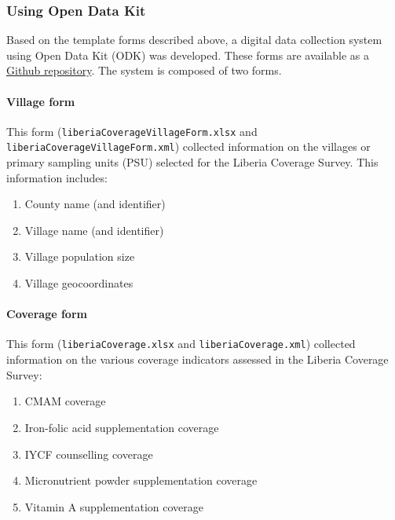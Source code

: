 \documentclass[12pt,a4paper]{article}
\let\oldparagraph\paragraph
\renewcommand{\paragraph}[1]{\oldparagraph{#1}\mbox{}}
\begin{document}
\hypertarget{using-open-data-kit}{%
\subsubsection{Using Open Data Kit}\label{using-open-data-kit}}

Based on the template forms described above, a digital data collection system using Open Data Kit (ODK) was developed. These forms are available as a \href{https://github.com/validmeasures/liberiaS3Mforms}{Github repository}. The system is composed of two forms.

\hypertarget{village-form}{%
\paragraph{Village form}\label{village-form}}

This form (\texttt{liberiaCoverageVillageForm.xlsx} and \texttt{liberiaCoverageVillageForm.xml}) collected information on the villages or primary sampling units (PSU) selected for the Liberia Coverage Survey. This information includes:

\begin{enumerate}
\def\labelenumi{\arabic{enumi}.}
\item
  County name (and identifier)
\item
  Village name (and identifier)
\item
  Village population size
\item
  Village geocoordinates
\end{enumerate}

\hypertarget{coverage-form}{%
\paragraph{Coverage form}\label{coverage-form}}

This form (\texttt{liberiaCoverage.xlsx} and \texttt{liberiaCoverage.xml}) collected information on the various coverage indicators assessed in the Liberia Coverage Survey:

\begin{enumerate}
\def\labelenumi{\arabic{enumi}.}
\item
  CMAM coverage
\item
  Iron-folic acid supplementation coverage
\item
  IYCF counselling coverage
\item
  Micronutrient powder supplementation coverage
\item
  Vitamin A supplementation coverage
\end{enumerate}
\end{document}
